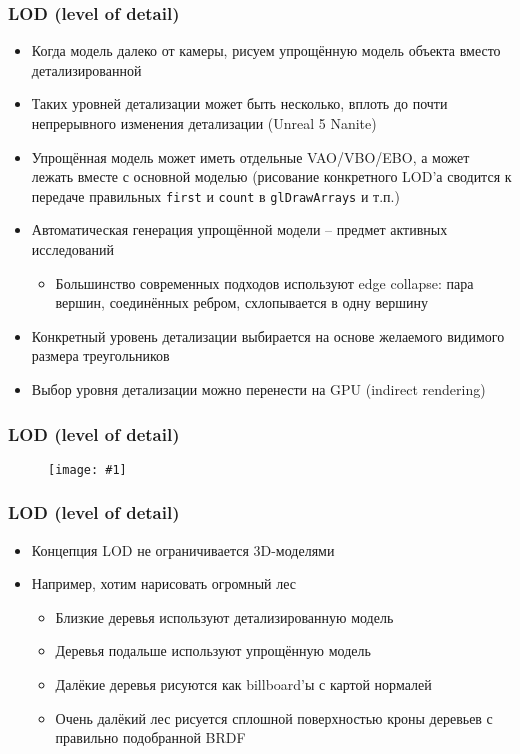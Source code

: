 \documentclass{beamer}
\newcommand{\slideimage}[1]{
  \begin{figure}
    \begin{adjustbox}{width=\textwidth, totalheight=\textheight-2\baselineskip-2\baselineskip,keepaspectratio}
      \texttt{[image: \#1]}
    \end{adjustbox}
  \end{figure}
}
\begin{document}
\begin{frame}[fragile]
\fontsize{10pt}{10pt}
\frametitle{LOD (level of detail)}
\begin{itemize}
\item Когда модель далеко от камеры, рисуем упрощённую модель объекта вместо детализированной
\pause
\item Таких уровней детализации может быть несколько, вплоть до почти непрерывного изменения детализации (Unreal 5 Nanite)
\pause
\item Упрощённая модель может иметь отдельные VAO/VBO/EBO, а может лежать вместе с основной моделью (рисование конкретного LOD'а сводится к передаче правильных \verb|first| и \verb|count| в \verb|glDrawArrays| и т.п.)
\pause
\item Автоматическая генерация упрощённой модели -- предмет активных исследований
\begin{itemize}
\item Большинство современных подходов используют edge collapse: пара вершин, соединённых ребром, схлопывается в одну вершину
\end{itemize}
\pause
\item Конкретный уровень детализации выбирается на основе желаемого видимого размера треугольников
\pause
\item Выбор уровня детализации можно перенести на GPU (indirect rendering)
\end{itemize}
\end{frame}

\begin{frame}[fragile]
\frametitle{LOD (level of detail)}
\slideimage{lod.jpg}
\end{frame}

\begin{frame}[fragile]
\frametitle{LOD (level of detail)}
\begin{itemize}
\item Концепция LOD не ограничивается 3D-моделями
\pause
\item Например, хотим нарисовать огромный лес
\pause
\begin{itemize}
\item Близкие деревья используют детализированную модель
\pause
\item Деревья подальше используют упрощённую модель
\pause
\item Далёкие деревья рисуются как billboard'ы с картой нормалей
\pause
\item Очень далёкий лес рисуется сплошной поверхностью кроны деревьев с правильно подобранной BRDF
\end{itemize}
\end{itemize}
\end{frame}
\end{document}
